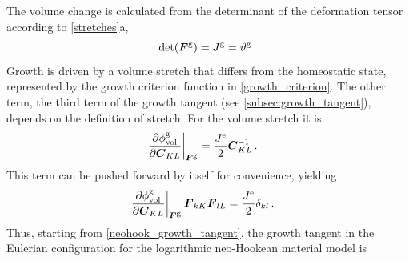 \documentclass[10pt,letterpaper,oneside]{report}
\newcommand{\ten}[1]{\mbox{\boldmath $#1$}{}}
\newcommand{\scas}[1]{\mbox{{\scriptsize{${\rm{#1}}$}}}{}}
\newcommand{\tens}[1]{\mbox{\boldmath{\scriptsize{$#1$}}}{}}
\begin{document}
The volume change is calculated from the determinant of the deformation tensor according to \autoref{stretches}a,
\begin{equation*}
\det (\ten{F}^{\scas{g}}) = J^{\scas{g}} = \vartheta^{\scas{g}} \, . 
\end{equation*}
Growth is driven by a volume stretch that differs from the homeostatic state, represented by the growth criterion function in \autoref{growth_criterion}.
The other term, the third term of the growth tangent (see \autoref{subsec:growth_tangent}), depends on the definition of stretch.  For the volume stretch it is
\begin{align}
\left. \frac{ \partial \phi^{\scas{g}}_{\scas{vol}} }{ \partial \ten{C}_{KL} } \right|_{\tens{F}^{\scas{g}}} ={}&\frac{J^{\scas{e}}}{2} \ten{C}^{-1}_{KL} \, .
\end{align}
This term can be pushed forward by itself for convenience, yielding
\begin{align}
\left. \frac{\partial \phi^{\scas{g}}_{\scas{vol}} }{\partial \ten{C}_{KL}} \right|_{\tens{F}^{\scas{g}}} \ten{F}_{kK} \ten{F}_{lL} 
={}& \frac{J^{\scas{e}}}{2} \delta_{kl} \, .
\label{growth_criterion_deriv_vol}
\end{align}
Thus, starting from \autoref{neohook_growth_tangent}, the growth tangent in the Eulerian configuration for the logarithmic neo-Hookean material model is
\end{document}
